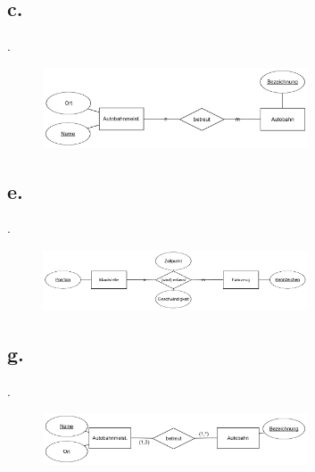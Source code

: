\documentclass{article}
\begin{document}
		
		
		\subsection*{c.}
		.
			\begin{figure}[h]
				\includegraphics[width=0.7\textwidth]{aufgabe_1_2_c.png}
			\end{figure}
			
		
		
		
		\subsection*{e.}
		.
			\begin{figure}[h]
				\includegraphics[width=0.7\textwidth]{aufgabe_1_2_e.png}
			\end{figure}
		
		
		
		
		\pagebreak
		
		\subsection*{g.}
		.
			\begin{figure}[h]
				\includegraphics[width=0.7\textwidth]{aufgabe_1_2_g.png}
			\end{figure}
		
		
		
\end{document}
